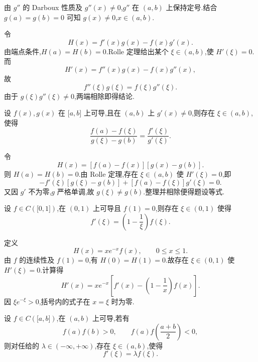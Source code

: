 \begin{solution}
    由 $g''$ 的 Darboux 性质及 $g''(x)\neq0$,$g''$ 在 $(a,b)$ 上保持定号.结合 $g(a)=g(b)=0$ 可知 $g(x)\neq0$,$x\in(a,b)$.

    令
    \[
        H(x)=f'(x)g(x)-f(x)g'(x).
    \]
    由端点条件,$H(a)=H(b)=0$.Rolle 定理给出某个 $\xi\in(a,b)$,使 $H'(\xi)=0$.而
    \[
        H'(x)=f''(x)g(x)-f(x)g''(x),
    \]
    故
    \[
        f''(\xi)g(\xi)=f(\xi)g''(\xi).
    \]
    由于 $g(\xi)g''(\xi)\neq0$,两端相除即得结论.
\end{solution}

\begin{example}
    设 $f(x),g(x)$ 在 $\lbrack a,b\rbrack$ 上可导,且在 $(a,b)$ 上 $g'(x)\neq0$,则存在 $\xi\in(a,b)$,使得
    \[
        \dfrac{f(a)-f(\xi)}{g(\xi)-g(b)}=\dfrac{f'(\xi)}{g'(\xi)}.
    \]
\end{example}
\exampleblank

\begin{solution}
    令
    \[
        H(x)=[f(a)-f(x)][g(x)-g(b)].
    \]
    则 $H(a)=H(b)=0$.由 Rolle 定理,存在 $\xi\in(a,b)$ 使 $H'(\xi)=0$,即
    \[
        -f'(\xi)[g(\xi)-g(b)]
        +[f(a)-f(\xi)]g'(\xi)=0.
    \]
    又因 $g'$ 不为零,$g$ 严格单调,故 $g(\xi)\neq g(b)$.整理并相除便得题设等式.
\end{solution}

\begin{example}
    设 $f\in C(\lbrack 0,1\rbrack)$,在 $(0,1)$ 上可导且 $f(1)=0$,则存在 $\xi\in(0,1)$ 使得
    \[
        f'(\xi)=\left(1-\dfrac{1}{\xi}\right)f(\xi).
    \]
\end{example}
\exampleblank

\begin{solution}
    定义
    \[
        H(x)=xe^{-x}f(x),
        \qquad 0\leq x\leq1.
    \]
    由 $f$ 的连续性及 $f(1)=0$,有 $H(0)=H(1)=0$.故存在 $\xi\in(0,1)$ 使 $H'(\xi)=0$.计算得
    \[
        H'(x)=xe^{-x}\left[f'(x)-\left(1-\dfrac{1}{x}\right)f(x)\right].
    \]
    因 $\xi e^{-\xi}>0$,括号内的式子在 $x=\xi$ 时为零.
\end{solution}

\begin{example}
    设 $f\in C(\lbrack a,b\rbrack)$,在 $(a,b)$ 上可导,若有
    \[
        f(a)f(b)>0,
        \qquad
        f(a)f\left(\dfrac{a+b}{2}\right)<0,
    \]
    则对任给的 $\lambda\in(-\infty,+\infty)$,存在 $\xi\in(a,b)$,使得
    \[
        f'(\xi)=\lambda f(\xi).
    \]
\end{example}
\exampleblank

